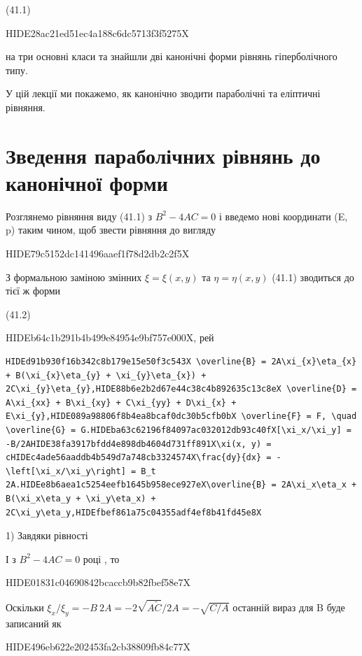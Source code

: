 \documentclass[
  ukrainian,
]{article}
\begin{document}
(41.1)

HIDE28ac21ed51ec4a188c6dc5713f3f5275X

на три основні класи та знайшли дві канонічні форми рівнянь
гіперболічного типу.

У цій лекції ми покажемо, як канонічно зводити параболічні та еліптичні
рівняння.

\section{Зведення параболічних рівнянь до канонічної
форми}\label{ux437ux432ux435ux434ux435ux43dux43dux44f-ux43fux430ux440ux430ux431ux43eux43bux456ux447ux43dux438ux445-ux440ux456ux432ux43dux44fux43dux44c-ux434ux43e-ux43aux430ux43dux43eux43dux456ux447ux43dux43eux457-ux444ux43eux440ux43cux438}

Розглянемо рівняння виду (41.1) з \(B^2 - 4AC = 0\) і введемо нові
координати (E, p) таким чином, щоб звести рівняння до вигляду

HIDE79c5152dc141496aaef1f78d2db2c2f5X

З формальною заміною змінних \(\xi = \xi(x, y)\) та
\(\eta = \eta(x, y)\) (41.1) зводиться до тієї ж форми

(41.2)

HIDEb64c1b291b4b499e84954e9bf757e000X, рей

\begin{verbatim}
HIDEd91b930f16b342c8b179e15e50f3c543X \overline{B} = 2A\xi_{x}\eta_{x} + B(\xi_{x}\eta_{y} + \xi_{y}\eta_{x}) + 2C\xi_{y}\eta_{y},HIDE88b6e2b2d67e44c38c4b892635c13c8eX \overline{D} = A\xi_{xx} + B\xi_{xy} + C\xi_{yy} + D\xi_{x} + E\xi_{y},HIDE089a98806f8b4ea8bcaf0dc30b5cfb0bX \overline{F} = F, \quad \overline{G} = G.HIDEba63c62196f84097ac032012db93c40fX[\xi_x/\xi_y] = -B/2AHIDE38fa3917bfdd4e898db4604d731ff891X\xi(x, y) = cHIDEc4ade56aaddb4b549d7a748cb3324574X\frac{dy}{dx} = -\left[\xi_x/\xi_y\right] = B_t 2A.HIDEe8b6aea1c5254eefb1645b958ece927eX\overline{B} = 2A\xi_x\eta_x + B(\xi_x\eta_y + \xi_y\eta_x) + 2C\xi_y\eta_y,HIDEfbef861a75c04355adf4ef8b41fd45e8X
\end{verbatim}

1) Завдяки рівності

І з \(B^2 - 4AC = 0\) році , то

HIDE01831c04690842bcaccb9b82fbef58e7X

Оскільки
\(\xi_x/\xi_y = -B \ 2A = -2 \sqrt{A\tilde{C}}/2A = -\sqrt{C/A}\)
останній вираз для B буде записаний як

HIDE496eb622e202453fa2cb38809fb84c77X
\end{document}
